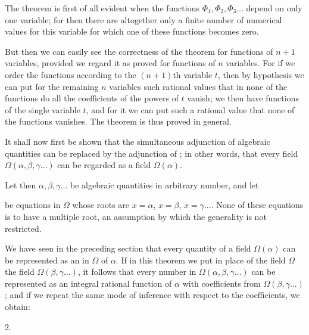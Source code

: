 The theorem is first of all evident when the functions $\Phi_1, \Phi_2, \Phi_3\ldots$ depend on only one variable; for then there are altogether only a finite number of numerical values for this variable for which one of these functions becomes zero.

But then we can easily see the correctness of the theorem for functions of $n+1$ variables, provided we regard it as proved for functions of $n$ variables. For if we order the functions according to the $(n+1)$th variable $t$, then by hypothesis we can put for the remaining $n$ variables such rational values that in none of the functions do all the coefficients of the powers of $t$ vanish; we then have functions of the single variable $t$, and for it we can put such a rational value that none of the functions vanishes. The theorem is thus proved in general.

It shall now first be shown that the simultaneous adjunction of  algebraic quantities can be replaced by the adjunction of ; in other words, that every field $\Omega(\alpha, \beta, \gamma\ldots)$ can be regarded as a field $\Omega(\alpha)$.

Let then $\alpha, \beta, \gamma\ldots$ be algebraic quantities in arbitrary number, and let


be equations in $\Omega$ whose roots are $x=\alpha$, $x=\beta$, $x=\gamma\ldots$. None of these equations is to have a multiple root, an assumption by which the generality is not restricted.

We have seen in the preceding section that every quantity of a field $\Omega(\alpha)$ can be represented as an  in $\Omega$ of $\alpha$. If in this theorem we put in place of the field $\Omega$ the field $\Omega(\beta, \gamma\ldots)$, it follows that every number in $\Omega(\alpha, \beta, \gamma\ldots)$ can be represented as an integral rational function of $\alpha$ with coefficients from $\Omega(\beta, \gamma\ldots)$; and if we repeat the same mode of inference with respect to the coefficients, we obtain:

2. 

